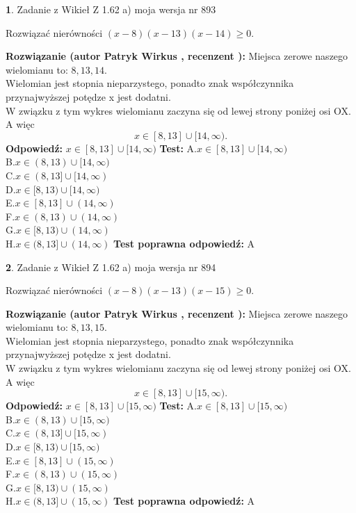\documentclass[12pt, a4paper]{article}
\theoremstyle{definition} %
\newtheorem{zad}{}
\newcommand{\zadStart}[1]{\begin{zad}#1\newline}
\newcommand{\zadStop}{\end{zad}}
\newcommand{\rozwStart}[2]{\noindent \textbf{Rozwiązanie (autor #1 , recenzent #2): }\newline}
\newcommand{\rozwStop}{\newline}
\newcommand{\odpStart}{\noindent \textbf{Odpowiedź:}\newline}
\newcommand{\odpStop}{\newline}
\newcommand{\testStart}{\noindent \textbf{Test:}\newline}
\newcommand{\testStop}{\newline}
\newcommand{\kluczStart}{\noindent \textbf{Test poprawna odpowiedź:}\newline}
\newcommand{\kluczStop}{\newline}
\begin{document}
\zadStart{Zadanie z Wikieł Z 1.62 a) moja wersja nr 893}

Rozwiązać nierówności $(x-8)(x-13)(x-14)\ge0$.
\zadStop
\rozwStart{Patryk Wirkus}{}
Miejsca zerowe naszego wielomianu to: $8, 13, 14$.\\
Wielomian jest stopnia nieparzystego, ponadto znak współczynnika przy\linebreak najwyższej potędze x jest dodatni.\\ W związku z tym wykres wielomianu zaczyna się od lewej strony poniżej osi OX. A więc $$x \in [8,13] \cup [14,\infty).$$
\rozwStop
\odpStart
$x \in [8,13] \cup [14,\infty)$
\odpStop
\testStart
A.$x \in [8,13] \cup [14,\infty)$\\
B.$x \in (8,13) \cup [14,\infty)$\\
C.$x \in (8,13] \cup [14,\infty)$\\
D.$x \in [8,13) \cup [14,\infty)$\\
E.$x \in [8,13] \cup (14,\infty)$\\
F.$x \in (8,13) \cup (14,\infty)$\\
G.$x \in [8,13) \cup (14,\infty)$\\
H.$x \in (8,13] \cup (14,\infty)$
\testStop
\kluczStart
A
\kluczStop



\zadStart{Zadanie z Wikieł Z 1.62 a) moja wersja nr 894}

Rozwiązać nierówności $(x-8)(x-13)(x-15)\ge0$.
\zadStop
\rozwStart{Patryk Wirkus}{}
Miejsca zerowe naszego wielomianu to: $8, 13, 15$.\\
Wielomian jest stopnia nieparzystego, ponadto znak współczynnika przy\linebreak najwyższej potędze x jest dodatni.\\ W związku z tym wykres wielomianu zaczyna się od lewej strony poniżej osi OX. A więc $$x \in [8,13] \cup [15,\infty).$$
\rozwStop
\odpStart
$x \in [8,13] \cup [15,\infty)$
\odpStop
\testStart
A.$x \in [8,13] \cup [15,\infty)$\\
B.$x \in (8,13) \cup [15,\infty)$\\
C.$x \in (8,13] \cup [15,\infty)$\\
D.$x \in [8,13) \cup [15,\infty)$\\
E.$x \in [8,13] \cup (15,\infty)$\\
F.$x \in (8,13) \cup (15,\infty)$\\
G.$x \in [8,13) \cup (15,\infty)$\\
H.$x \in (8,13] \cup (15,\infty)$
\testStop
\kluczStart
A
\kluczStop
\end{document}
